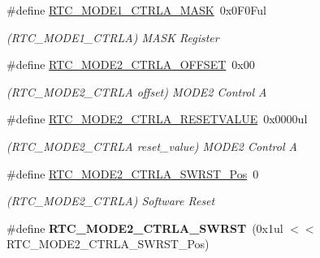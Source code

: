\begin{DoxyCompactItemize}
\item 
\hypertarget{group___s_a_m_l21___r_t_c_gaab772bdd47f9197012c06121f5fe197f}{}\#define \hyperlink{group___s_a_m_l21___r_t_c_gaab772bdd47f9197012c06121f5fe197f}{R\+T\+C\+\_\+\+M\+O\+D\+E1\+\_\+\+C\+T\+R\+L\+A\+\_\+\+M\+A\+S\+K}~0x0\+F0\+Ful\label{group___s_a_m_l21___r_t_c_gaab772bdd47f9197012c06121f5fe197f}

\begin{DoxyCompactList}\small\item\em (R\+T\+C\+\_\+\+M\+O\+D\+E1\+\_\+\+C\+T\+R\+L\+A) M\+A\+S\+K Register \end{DoxyCompactList}\item 
\hypertarget{group___s_a_m_l21___r_t_c_ga31b923ef2df7ee74f32b591bf8e277b2}{}\#define \hyperlink{group___s_a_m_l21___r_t_c_ga31b923ef2df7ee74f32b591bf8e277b2}{R\+T\+C\+\_\+\+M\+O\+D\+E2\+\_\+\+C\+T\+R\+L\+A\+\_\+\+O\+F\+F\+S\+E\+T}~0x00\label{group___s_a_m_l21___r_t_c_ga31b923ef2df7ee74f32b591bf8e277b2}

\begin{DoxyCompactList}\small\item\em (R\+T\+C\+\_\+\+M\+O\+D\+E2\+\_\+\+C\+T\+R\+L\+A offset) M\+O\+D\+E2 Control A \end{DoxyCompactList}\item 
\hypertarget{group___s_a_m_l21___r_t_c_gaca34c2a0fa03f3999dcaca040d89343e}{}\#define \hyperlink{group___s_a_m_l21___r_t_c_gaca34c2a0fa03f3999dcaca040d89343e}{R\+T\+C\+\_\+\+M\+O\+D\+E2\+\_\+\+C\+T\+R\+L\+A\+\_\+\+R\+E\+S\+E\+T\+V\+A\+L\+U\+E}~0x0000ul\label{group___s_a_m_l21___r_t_c_gaca34c2a0fa03f3999dcaca040d89343e}

\begin{DoxyCompactList}\small\item\em (R\+T\+C\+\_\+\+M\+O\+D\+E2\+\_\+\+C\+T\+R\+L\+A reset\+\_\+value) M\+O\+D\+E2 Control A \end{DoxyCompactList}\item 
\hypertarget{group___s_a_m_l21___r_t_c_ga3bd5f1c7f80525445a2d25ed23bdcd52}{}\#define \hyperlink{group___s_a_m_l21___r_t_c_ga3bd5f1c7f80525445a2d25ed23bdcd52}{R\+T\+C\+\_\+\+M\+O\+D\+E2\+\_\+\+C\+T\+R\+L\+A\+\_\+\+S\+W\+R\+S\+T\+\_\+\+Pos}~0\label{group___s_a_m_l21___r_t_c_ga3bd5f1c7f80525445a2d25ed23bdcd52}

\begin{DoxyCompactList}\small\item\em (R\+T\+C\+\_\+\+M\+O\+D\+E2\+\_\+\+C\+T\+R\+L\+A) Software Reset \end{DoxyCompactList}\item 
\hypertarget{group___s_a_m_l21___r_t_c_gacbbfc93846a94d13c94d69ef2284c42a}{}\#define {\bfseries R\+T\+C\+\_\+\+M\+O\+D\+E2\+\_\+\+C\+T\+R\+L\+A\+\_\+\+S\+W\+R\+S\+T}~(0x1ul $<$$<$ R\+T\+C\+\_\+\+M\+O\+D\+E2\+\_\+\+C\+T\+R\+L\+A\+\_\+\+S\+W\+R\+S\+T\+\_\+\+Pos)\label{group___s_a_m_l21___r_t_c_gacbbfc93846a94d13c94d69ef2284c42a}


\end{DoxyCompactItemize}
